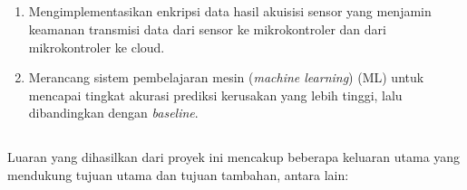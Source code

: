 \documentclass{elsinta}
\begin{document}
\subsection{\AdditionalObjectivesTitle}
\begin{enumerate} 
    \item   Mengimplementasikan enkripsi data hasil akuisisi
            sensor yang menjamin keamanan transmisi data 
            dari sensor ke mikrokontroler dan dari mikrokontroler ke cloud.
    \item   Merancang sistem pembelajaran mesin (\textit{machine learning}) (ML)
            untuk mencapai tingkat akurasi prediksi kerusakan yang
            lebih tinggi, lalu dibandingkan dengan \textit{baseline}.
\end{enumerate}

\subsection{\DeliverablesTitle}

Luaran yang dihasilkan dari proyek ini mencakup beberapa keluaran utama yang mendukung tujuan utama dan tujuan tambahan, antara lain:
\end{document}
